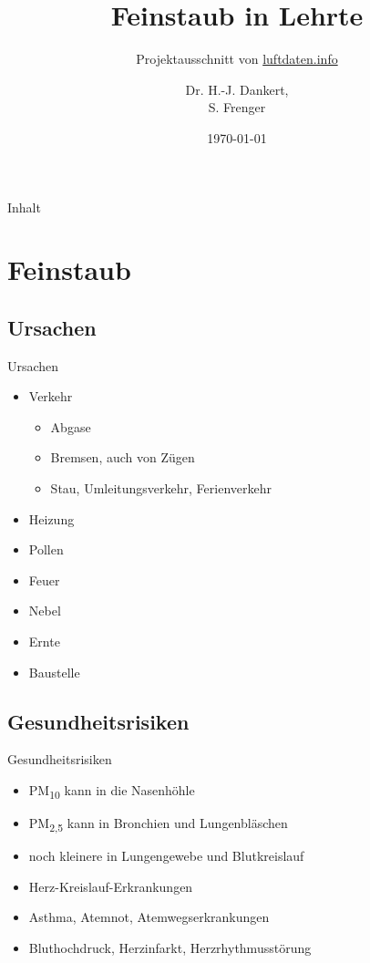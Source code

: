 \documentclass[aspectratio=169]{beamer} %
\begin{document}
\title{Feinstaub in Lehrte}
\subtitle{Projektausschnitt von \href{http://www.luftdaten.info}{luftdaten.info}}
\author{Dr. H.-J. Dankert,\\S. Frenger}
\date{\today}

\frame{\titlepage} 

\begin{frame}{Inhalt}
  \begin{multicols}{2}
    \tableofcontents
  \end{multicols}
\end{frame}

\section{Feinstaub}

\subsection{Ursachen}
\begin{frame}{Ursachen}
  \begin{itemize}
  \item Verkehr
    \begin{itemize}
    \item Abgase
    \item Bremsen, auch von Zügen
    \item Stau, Umleitungsverkehr, Ferienverkehr
    \end{itemize}
  \item Heizung
  \item Pollen
  \item Feuer
  \item Nebel
  \item Ernte
  \item Baustelle
  \end{itemize}
\end{frame}

\subsection{Gesundheitsrisiken}
\begin{frame}{Gesundheitsrisiken}
  \begin{itemize}
  \item PM\textsubscript{10} kann in die Nasenhöhle
  \item PM\textsubscript{2,5} kann in Bronchien und Lungenbläschen
  \item noch kleinere in Lungengewebe und Blutkreislauf
  \item Herz-Kreislauf-Erkrankungen
  \item Asthma, Atemnot, Atemwegserkrankungen
  \item Bluthochdruck, Herzinfarkt, Herzrhythmusstörung
  \end{itemize}
\end{frame}
\end{document}
